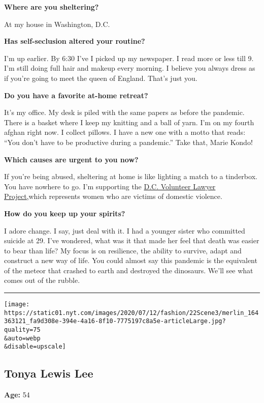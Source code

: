 \textbf{Where are you sheltering?}

At my house in Washington, D.C.

\textbf{Has self-seclusion altered your routine?}

I'm up earlier. By 6:30 I've I picked up my newspaper. I read more or
less till 9. I'm still doing full hair and makeup every morning. I
believe you always dress as if you're going to meet the queen of
England. That's just you.

\textbf{Do you have a favorite at-home retreat?}

It's my office. My desk is piled with the same papers as before the
pandemic. There is a basket where I keep my knitting and a ball of yarn.
I'm on my fourth afghan right now. I collect pillows. I have a new one
with a motto that reads: ``You don't have to be productive during a
pandemic.'' Take that, Marie Kondo!

\textbf{Which causes are urgent to you now?}

If you're being abused, sheltering at home is like lighting a match to a
tinderbox. You have nowhere to go. I'm supporting the
\href{https://www.dcvlp.org}{D.C. Volunteer Lawyer Project,}which
represents women who are victims of domestic violence.

\textbf{How do you keep up your spirits?}

I adore change. I say, just deal with it. I had a younger sister who
committed suicide at 29. I've wondered, what was it that made her feel
that death was easier to bear than life? My focus is on resilience, the
ability to survive, adapt and construct a new way of life. You could
almost say this pandemic is the equivalent of the meteor that crashed to
earth and destroyed the dinosaurs. We'll see what comes out of the
rubble.

\begin{center}\rule{0.5\linewidth}{\linethickness}\end{center}

\texttt{[image: https://static01.nyt.com/images/2020/07/12/fashion/22Scene3/merlin\_164363121\_fa9d308e-394e-4a16-8f10-7775197c8a5e-articleLarge.jpg?quality=75\\\&auto=webp\\\&disable=upscale]}

\hypertarget{tonya-lewis-lee}{%
\subsection{Tonya Lewis Lee}\label{tonya-lewis-lee}}

\textbf{Age:} 54

